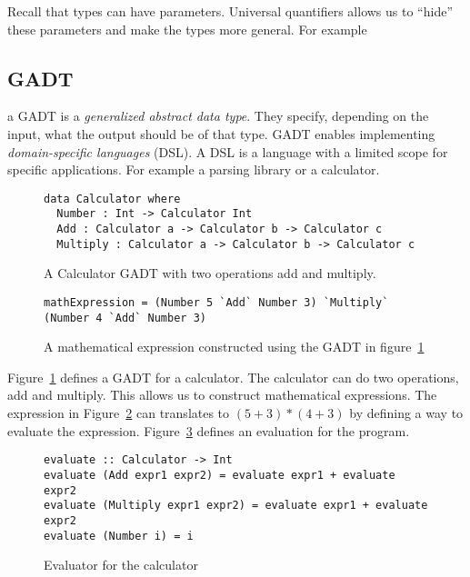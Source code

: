 Recall that types can have parameters. Universal quantifiers allows
us to ``hide'' these parameters and make the types more general. For example


\subsection{GADT}\label{gadt}

a GADT is a \textit{generalized abstract data type}.  They specify, depending on
the input, what the output should be of that type. GADT enables implementing
\textit{domain-specific languages} (DSL). A DSL is a language with a limited
scope for specific applications. For example a parsing library or a calculator.

\begin{figure}[H]
    \begin{lstlisting}
data Calculator where 
  Number : Int -> Calculator Int
  Add : Calculator a -> Calculator b -> Calculator c
  Multiply : Calculator a -> Calculator b -> Calculator c
    \end{lstlisting}
    \caption{A Calculator GADT with two operations add and multiply.}
    \label{gadtcalculator}
\end{figure}

\begin{figure}[H]
    \begin{lstlisting}
mathExpression = (Number 5 `Add` Number 3) `Multiply` (Number 4 `Add` Number 3)
    \end{lstlisting}
    \caption{A mathematical expression constructed using the GADT in
    figure~\ref{gadtcalculator}}
    \label{mathexpressiongadt}
\end{figure}


Figure~\ref{gadtcalculator} defines a GADT for a calculator. The calculator can
do two operations, add and multiply. This allows us to construct mathematical
expressions. The expression in Figure~\ref{mathexpressiongadt} can translates to
$(5+3)*(4+3)$ by defining a way to evaluate the expression.
Figure~\ref{calculator} defines an evaluation for the program.

\begin{figure}[H]
    \begin{lstlisting}
evaluate :: Calculator -> Int
evaluate (Add expr1 expr2) = evaluate expr1 + evaluate expr2
evaluate (Multiply expr1 expr2) = evaluate expr1 + evaluate expr2
evaluate (Number i) = i
    \end{lstlisting}
    \caption{Evaluator for the calculator}
    \label{calculator}
\end{figure}

